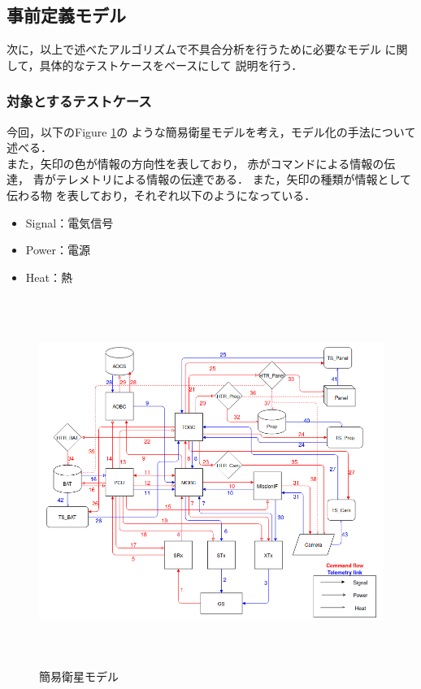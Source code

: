 \documentclass[11pt]{article}
\begin{document}
\subsection{事前定義モデル}
次に，以上で述べたアルゴリズムで不具合分析を行うために必要なモデル
に関して，具体的なテストケースをベースにして
説明を行う．%

\subsubsection{対象とするテストケース}
今回，以下のFigure \ref{fig:simple_sat}の
ような簡易衛星モデルを考え，モデル化の手法について
述べる．\\
また，矢印の色が情報の方向性を表しており，
赤がコマンドによる情報の伝達，
青がテレメトリによる情報の伝達である．
また，矢印の種類が情報として伝わる物
を表しており，それぞれ以下のようになっている．
\begin{itemize}
   \item Signal：電気信号
   \item Power：電源
   \item Heat：熱
\end{itemize}
\begin{figure}[H]
   \centering
      \includegraphics[height=12.0cm]{figure/satellite_diagram.PNG}
      \caption{簡易衛星モデル}
      \label{fig:simple_sat}
\end{figure}
\end{document}
